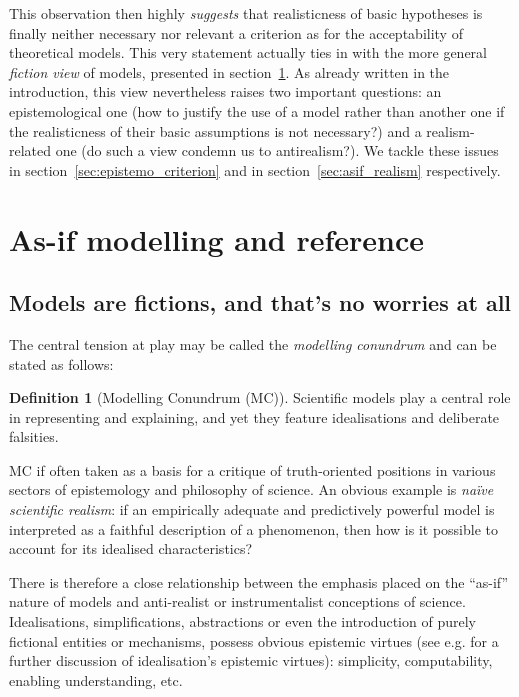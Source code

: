 \documentclass[a4paper,11pt]{article}
\theoremstyle{definition}
\newtheorem{definition}{Definition}
\begin{document}
This observation then highly \textit{suggests} that realisticness of basic hypotheses is finally neither necessary nor relevant a criterion as for the acceptability of theoretical models. This very statement actually ties in with the more general \textit{fiction view} of models, presented in section~\ref{sec:asifVerifJust}. As already written in the introduction, this view nevertheless raises two important questions: an epistemological one (how to justify the use of a model rather than another one if the realisticness of their basic assumptions is not necessary?) and a realism-related one (do such a view condemn us to antirealism?). We tackle these issues in section~\ref{sec:epistemo_criterion} and in section~\ref{sec:asif_realism} respectively.

\section{As-if modelling and reference}
\label{sec:asifVerifJust}

\subsection{Models are fictions, and that's no worries at all}

The central tension at play may be called the \textit{modelling conundrum} and can be stated as follows:

\begin{definition}[Modelling Conundrum (MC)]
    Scientific models play a central role in representing and explaining, and yet they feature idealisations and deliberate falsities.
\label{def:conundrum}
\end{definition}

MC if often taken as a basis for a critique of truth-oriented positions in various sectors of epistemology and philosophy of science. An obvious example is \textit{naïve scientific realism}: if an empirically adequate and predictively powerful model is interpreted as a faithful description of a phenomenon, then how is it possible to account for its idealised characteristics?

There is therefore a close relationship between the emphasis placed on the ``as-if'' nature of models and anti-realist or instrumentalist conceptions of science. Idealisations, simplifications, abstractions or even the introduction of purely fictional entities or mechanisms, possess obvious epistemic virtues (see e.g. \citep{Sullivan2019, Lawler2019, Nawar2019, Pincock2021} for a further discussion of idealisation's epistemic virtues): simplicity, computability, enabling understanding, etc. 
\end{document}
